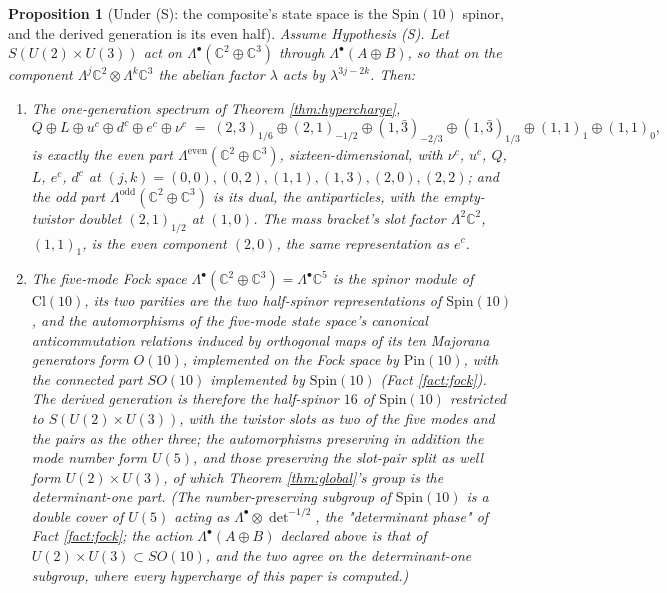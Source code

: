 \documentclass[11pt]{article}
\newtheorem{proposition}[theorem]{Proposition}
\theoremstyle{definition}
\newcommand{\Cl}{\mathrm{Cl}}
\newcommand{\C}{\mathbb{C}}
\begin{document}
\begin{proposition}[Under (S): the composite's state space is the $\mathrm{Spin}(10)$ spinor, and the derived generation is its even half]\label{prop:sixteen}
Assume Hypothesis (S). Let $S(U(2) \times U(3))$ act on $\Lambda^{\bullet}(\C^{2} \oplus \C^{3})$ through $\Lambda^{\bullet}(A \oplus B)$, so that on the component $\Lambda^{j}\C^{2} \otimes \Lambda^{k}\C^{3}$ the abelian factor $\lambda$ acts by $\lambda^{3j - 2k}$. Then:
\begin{enumerate}
\item The one-generation spectrum of Theorem \ref{thm:hypercharge},
\[
Q \oplus L \oplus u^{c} \oplus d^{c} \oplus e^{c} \oplus \nu^{c}
\;=\; (2,3)_{1/6} \oplus (2,1)_{-1/2} \oplus (1,\bar{3})_{-2/3} \oplus (1,\bar{3})_{1/3} \oplus (1,1)_{1} \oplus (1,1)_{0},
\]
is exactly the even part $\Lambda^{\mathrm{even}}(\C^{2} \oplus \C^{3})$, sixteen-dimensional, with $\nu^{c}$, $u^{c}$, $Q$, $L$, $e^{c}$, $d^{c}$ at $(j, k) = (0,0), (0,2), (1,1), (1,3), (2,0), (2,2)$; and the odd part $\Lambda^{\mathrm{odd}}(\C^{2} \oplus \C^{3})$ is its dual, the antiparticles, with the empty-twistor doublet $(2,1)_{1/2}$ at $(1,0)$. The mass bracket's slot factor $\Lambda^{2}\C^{2}$, $(1,1)_{1}$, is the even component $(2,0)$, the same representation as $e^{c}$.
\item The five-mode Fock space $\Lambda^{\bullet}(\C^{2} \oplus \C^{3}) = \Lambda^{\bullet}\C^{5}$ is the spinor module of $\Cl(10)$, its two parities are the two half-spinor representations of $\mathrm{Spin}(10)$, and the automorphisms of the five-mode state space's canonical anticommutation relations induced by orthogonal maps of its ten Majorana generators form $O(10)$, implemented on the Fock space by $\mathrm{Pin}(10)$, with the connected part $SO(10)$ implemented by $\mathrm{Spin}(10)$ (Fact \ref{fact:fock}). The derived generation is therefore the half-spinor $16$ of $\mathrm{Spin}(10)$ restricted to $S(U(2) \times U(3))$, with the twistor slots as two of the five modes and the pairs as the other three; the automorphisms preserving in addition the mode number form $U(5)$, and those preserving the slot-pair split as well form $U(2) \times U(3)$, of which Theorem \ref{thm:global}'s group is the determinant-one part. (The number-preserving subgroup of $\mathrm{Spin}(10)$ is a double cover of $U(5)$ acting as $\Lambda^{\bullet} \otimes \det^{-1/2}$, the "determinant phase" of Fact \ref{fact:fock}; the action $\Lambda^{\bullet}(A \oplus B)$ declared above is that of $U(2) \times U(3) \subset SO(10)$, and the two agree on the determinant-one subgroup, where every hypercharge of this paper is computed.)

\end{enumerate}
\end{proposition}
\end{document}
